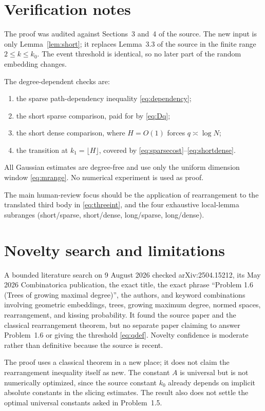 \documentclass[11pt]{article}
\begin{document}
\section*{Verification notes}

The proof was audited against Sections~3 and~4 of the source. The new input is
only Lemma~\ref{lem:short}; it replaces Lemma~3.3 of the source in the finite
range $2\leq k\leq k_0$. The event threshold is identical, so no later part
of the random embedding changes.

The degree-dependent checks are:
\begin{enumerate}
 \item the sparse path-dependency inequality \eqref{eq:dependency};
 \item the short sparse comparison, paid for by \eqref{eq:Dq};
 \item the short dense comparison, where $H=O(1)$ forces
 $q\asymp\log N$;
 \item the transition at $k_1=\lfloor H\rfloor$, covered by
 \eqref{eq:sparsecost}--\eqref{eq:shortdense}.
\end{enumerate}
All Gaussian estimates are degree-free and use only the uniform dimension
window \eqref{eq:mrange}. No numerical experiment is used as proof.

The main human-review focus should be the application of rearrangement to the
translated third body in \eqref{eq:threeint}, and the four exhaustive
local-lemma subranges (short/sparse, short/dense, long/sparse, long/dense).

\section*{Novelty search and limitations}

A bounded literature search on 9 August 2026 checked arXiv:2504.15212, its
May 2026 Combinatorica publication, the exact title, the exact phrase
``Problem 1.6 (Trees of growing maximal degree)'', the authors, and keyword
combinations involving geometric embeddings, trees, growing maximum degree,
normed spaces, rearrangement, and kissing probability. It found the source
paper and the classical rearrangement theorem, but no separate paper claiming
to answer Problem~1.6 or giving the threshold \eqref{eq:qdef}. Novelty
confidence is moderate rather than definitive because the source is recent.

The proof uses a classical theorem in a new place; it does not claim the
rearrangement inequality itself as new. The constant $A$ is universal but is
not numerically optimized, since the source constant $k_0$ already depends on
implicit absolute constants in the slicing estimates. The result also does
not settle the optimal universal constants asked in Problem~1.5.
\end{document}
